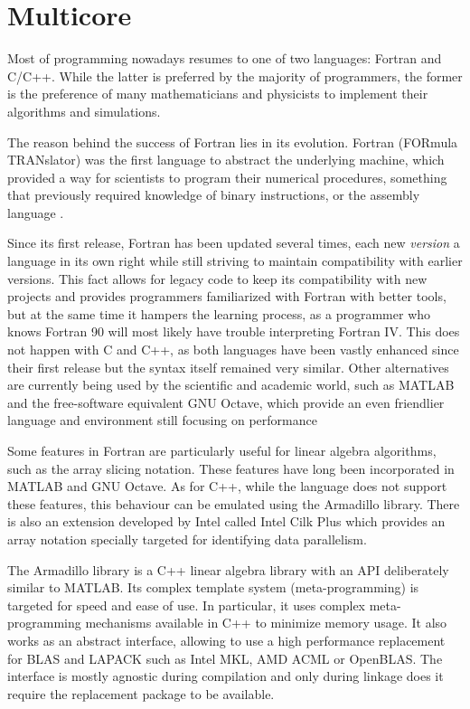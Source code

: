 \documentclass[../thesis]{subfiles}
\begin{document}
	\chapter{Multicore}
	\label{chp:multicore}

	Most of \hpc programming nowadays resumes to one of two languages: Fortran and C/C++. While the latter is preferred by the majority of programmers, the former is the preference of many mathematicians and physicists to implement their algorithms and simulations.

	The reason behind the success of Fortran lies in its evolution. Fortran (FORmula TRANslator) was the first language to abstract the underlying machine, which provided a way for scientists to program their numerical procedures, something that previously required knowledge of binary instructions, or the assembly language \cite{IBM100:Fortran}.

	Since its first release, Fortran has been updated several times, each new \textit{version} a language in its own right while still striving to maintain compatibility with earlier versions. This fact allows for legacy code to keep its compatibility with new projects and provides programmers familiarized with Fortran with better tools, but at the same time it hampers the learning process, as a programmer who knows Fortran 90 will most likely have trouble interpreting Fortran IV. This does not happen with C and C++, as both languages have been vastly enhanced since their first release but the syntax itself remained very similar. Other alternatives are currently being used by the scientific and academic world, such as MATLAB and the free-software equivalent GNU Octave, which provide an even friendlier language and environment still focusing on performance

	Some features in Fortran are particularly useful for linear algebra algorithms, such as the array slicing notation. These features have long been incorporated in MATLAB and GNU Octave. As for C++, while the language does not support these features, this behaviour can be emulated using the Armadillo library. There is also an extension developed by Intel called Intel Cilk Plus which provides an array notation specially targeted for identifying data parallelism.

	The Armadillo library is a C++ linear algebra library with an API deliberately similar to MATLAB. Its complex template system (meta-programming) is targeted for speed and ease of use. In particular, it uses complex meta-programming mechanisms available in C++ to minimize memory usage. It also works as an abstract interface, allowing to use a high performance replacement for BLAS and LAPACK such as Intel MKL, AMD ACML or OpenBLAS. The interface is mostly agnostic during compilation and only during linkage does it require the replacement package to be available.
\end{document}
